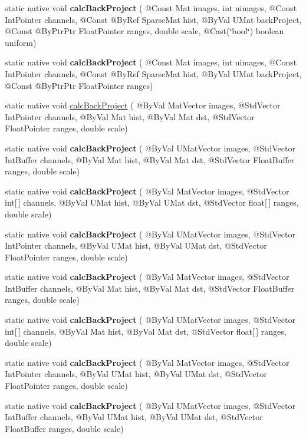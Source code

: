 \begin{DoxyCompactItemize}
\item 
static native void {\bfseries calc\+Back\+Project} ( @Const Mat images, int nimages, @Const Int\+Pointer channels, @Const @By\+Ref Sparse\+Mat hist, @By\+Val U\+Mat back\+Project, @Const @By\+Ptr\+Ptr Float\+Pointer ranges, double scale, @Cast(\char`\"{}bool\char`\"{}) boolean uniform)
\item 
static native void {\bfseries calc\+Back\+Project} ( @Const Mat images, int nimages, @Const Int\+Pointer channels, @Const @By\+Ref Sparse\+Mat hist, @By\+Val U\+Mat back\+Project, @Const @By\+Ptr\+Ptr Float\+Pointer ranges)
\item 
static native void \hyperlink{group__imgproc__hist_ga08b1470561cb4171cc528b2bdba50764}{calc\+Back\+Project} ( @By\+Val Mat\+Vector images, @Std\+Vector Int\+Pointer channels, @By\+Val Mat hist, @By\+Val Mat dst, @Std\+Vector Float\+Pointer ranges, double scale)
\item 
static native void {\bfseries calc\+Back\+Project} ( @By\+Val U\+Mat\+Vector images, @Std\+Vector Int\+Buffer channels, @By\+Val Mat hist, @By\+Val Mat dst, @Std\+Vector Float\+Buffer ranges, double scale)
\item 
static native void {\bfseries calc\+Back\+Project} ( @By\+Val Mat\+Vector images, @Std\+Vector int\mbox{[}$\,$\mbox{]} channels, @By\+Val U\+Mat hist, @By\+Val U\+Mat dst, @Std\+Vector float\mbox{[}$\,$\mbox{]} ranges, double scale)
\item 
static native void {\bfseries calc\+Back\+Project} ( @By\+Val U\+Mat\+Vector images, @Std\+Vector Int\+Pointer channels, @By\+Val U\+Mat hist, @By\+Val U\+Mat dst, @Std\+Vector Float\+Pointer ranges, double scale)
\item 
static native void {\bfseries calc\+Back\+Project} ( @By\+Val Mat\+Vector images, @Std\+Vector Int\+Buffer channels, @By\+Val Mat hist, @By\+Val Mat dst, @Std\+Vector Float\+Buffer ranges, double scale)
\item 
static native void {\bfseries calc\+Back\+Project} ( @By\+Val U\+Mat\+Vector images, @Std\+Vector int\mbox{[}$\,$\mbox{]} channels, @By\+Val Mat hist, @By\+Val Mat dst, @Std\+Vector float\mbox{[}$\,$\mbox{]} ranges, double scale)
\item 
static native void {\bfseries calc\+Back\+Project} ( @By\+Val Mat\+Vector images, @Std\+Vector Int\+Pointer channels, @By\+Val U\+Mat hist, @By\+Val U\+Mat dst, @Std\+Vector Float\+Pointer ranges, double scale)
\item 
static native void {\bfseries calc\+Back\+Project} ( @By\+Val U\+Mat\+Vector images, @Std\+Vector Int\+Buffer channels, @By\+Val U\+Mat hist, @By\+Val U\+Mat dst, @Std\+Vector Float\+Buffer ranges, double scale)

\end{DoxyCompactItemize}
